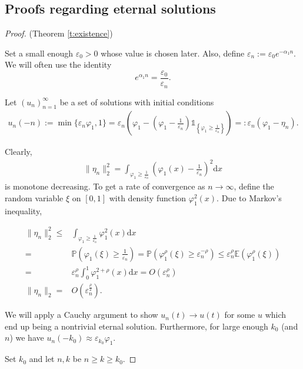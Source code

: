 \documentclass{article}
\newcommand{\pr}{\mathbb{P}}
\newcommand{\E}{\mathbb{E}}
\renewcommand{\d}{\mathrm{d}}
\newcommand{\1}[1]{{\mathds{1}}_{\left\{#1\right\}}}
\begin{document}
\subsection{Proofs regarding eternal solutions}
\label{s:proof_eternal}
\begin{proof}(Theorem \ref{t:existence})
	
	Set a small enough $\varepsilon_0>0$ whose value is chosen later. Also, define $\varepsilon_n:=\varepsilon_0 e^{-\alpha_1 n}.$ We will often use the identity
	$$e^{\alpha_1 n}= \frac{\varepsilon_0}{\varepsilon_n}. $$
	
	Let $(u_n)_{n=1}^{\infty}$ be a set of solutions with initial conditions
	\begin{align*}
		u_n(-n):=\min\{\varepsilon_n \varphi_1,1\}=\varepsilon_n \left(\varphi_1 -\left(\varphi_1-\frac{1}{\varepsilon_n}\right) \1{\varphi_1 \geq \frac{1}{\varepsilon_n}} \right)=:\varepsilon_n\left(\varphi_1-\eta_n \right).
	\end{align*}
	
	Clearly,
	\begin{align*}
		\| \eta_n \|_2^2=\int_{\varphi_1 \geq \frac{1}{\varepsilon_n}} \left(\varphi_1(x)-\frac{1}{\varepsilon_n}\right)^2 \d x 
	\end{align*}
	is monotone decreasing. To get a rate of convergence as $n \to \infty$, define the random variable $\xi$ on $[0,1]$ with density function $\varphi_1^2(x).$ Due to Markov's inequality,
	
	\begin{align*}
		\|\eta_{n} \|_2^2 \leq &\int_{\varphi_1 \geq \frac{1}{\varepsilon_n}} \varphi_1^2(x) \d x\\
		=& \pr \left(\varphi_1(\xi) \geq \frac{1}{\varepsilon_n}\right)=\pr \left(\varphi_1^{\rho}(\xi) \geq \varepsilon_n^{-\rho} \right) \leq \varepsilon_n^{\rho} \E \left( \varphi_1^{\rho}(\xi) \right)\\
		=& \varepsilon_n^{\rho} \int_{0}^{1}\varphi_1^{2+\rho}(x) \d x=O \left(\varepsilon_n^{\rho}\right) \\
		\|\eta_{n} \|_2=& O \left(\varepsilon_n^{\frac{\rho}{2}}\right).
	\end{align*}
	
	We will apply a Cauchy argument to show $u_n(t) \to u(t)$ for some $u$ which end up being a nontrivial eternal solution. Furthermore, for large enough $k_0 $ (and $n$) we have $u_n(-k_0) \approx \varepsilon_{k_0} \varphi_1.$
	
	Set $k_0$  and let $n,k$ be $n \geq k \geq k_0.$ 
	

\end{proof}
\end{document}

